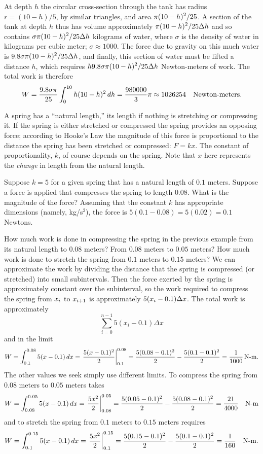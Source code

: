At depth $h$ the circular cross-section through the tank has radius
$r=(10-h)/5$, by similar triangles,
 and area $\displaystyle \pi(10-h)^2/25$. A section of the tank at depth
$h$ thus has volume approximately $\displaystyle \pi(10-h)^2/25\Delta h$ and so
contains $\displaystyle \sigma\pi(10-h)^2/25\Delta h$ kilograms of water, where
$\sigma$ is the density of water in kilograms per cubic meter;
$\sigma\approx 1000$. The force due to gravity on this much water is
$\displaystyle 9.8\sigma\pi(10-h)^2/25\Delta h$, and finally, this section of water
must be lifted a distance $h$, which requires
$\displaystyle h9.8\sigma\pi(10-h)^2/25\Delta h$ Newton-meters of work. The total
work is therefore
$$W={9.8\sigma\pi\over 25} \int_0^{10} h(10-h)^2\,dh={980000\over3}\pi\approx
1026254\quad\hbox{Newton-meters.}$$
\endexample

A spring has a ``natural length,'' its length if nothing is stretching
or compressing it. If the spring is either stretched or compressed the
spring provides an opposing force; according to {\dfont Hooke's
Law\/} the magnitude of this force is proportional to the
distance the spring has been stretched or compressed: $F=kx$.
The constant of proportionality, $k$, of course depends on the
spring. Note that $x$ here represents the {\em change\/} in length from the
natural length.

\example Suppose $k=5$ for a given spring that has a natural length of
$0.1$ meters. Suppose a force is applied that compresses the spring to
length $0.08$. What is the magnitude of the force? Assuming that the
constant $k$ has appropriate dimensions (namely, kg/s$^2$), the force is
$5(0.1-0.08)=5(0.02)=0.1$ Newtons.
\endexample

\example How much work is done in compressing the spring in the
previous example from its natural length to $0.08$ meters? From $0.08$
meters to $0.05$ meters? How much work is done to stretch the spring
from $0.1$ meters to $0.15$ meters?  We can approximate the work by
dividing the distance that the spring is compressed (or stretched)
into small subintervals. Then the force exerted by the spring is
approximately constant over the subinterval, so the work required to
compress the spring from $\displaystyle x_i$ to $\displaystyle x_{i+1}$ is approximately
$\displaystyle 5(x_i-0.1)\Delta x$.  The total work is approximately
$$\sum_{i=0}^{n-1} 5(x_i-0.1)\Delta x$$
and in the limit
$$W=\int_{0.1}^{0.08} 5(x-0.1)\,dx=\left.{5(x-0.1)^2\over2}\right|_{0.1}^{0.08}=
{5(0.08-0.1)^2\over2}-{5(0.1-0.1)^2\over2}={1\over1000}\,\hbox{N-m}.$$
The other values we seek simply use different limits. To compress the
spring from $0.08$
meters to $0.05$ meters takes
$$W=\int_{0.08}^{0.05} 5(x-0.1)\,dx=\left.{5x^2\over2}\right|_{0.08}^{0.05}=
{5(0.05-0.1)^2\over2}-{5(0.08-0.1)^2\over2}={21\over4000}\quad\hbox{N-m}$$
and to stretch the spring
from $0.1$ meters to $0.15$ meters requires
$$W=\int_{0.1}^{0.15} 5(x-0.1)\,dx=\left.{5x^2\over2}\right|_{0.1}^{0.15}=
{5(0.15-0.1)^2\over2}-{5(0.1-0.1)^2\over2}={1\over160}\quad\hbox{N-m}.$$
\endexample

